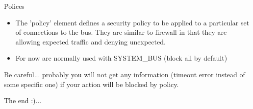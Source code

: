 \documentclass{beamer}
\begin{document}
\begin{frame}{Polices}
  \begin{itemize}
    \item The 'policy' element defines a security policy to be applied to a particular set of connections to the bus. They are similar to firewall in that they are allowing expected traffic and denying unexpected.
    \item For now are normally used with SYSTEM\_BUS (block all by default) 
  \end{itemize}
  \vfill
  \begin{alertblock}{Be careful...}
    probably you will not get any information (timeout error instead of some specific one) if your action will be blocked by policy.
  \end{alertblock} 
\end{frame}

\begin{frame}
\begin{center}
\huge The end :)...
\end{center}
\end{frame}
\end{document}
